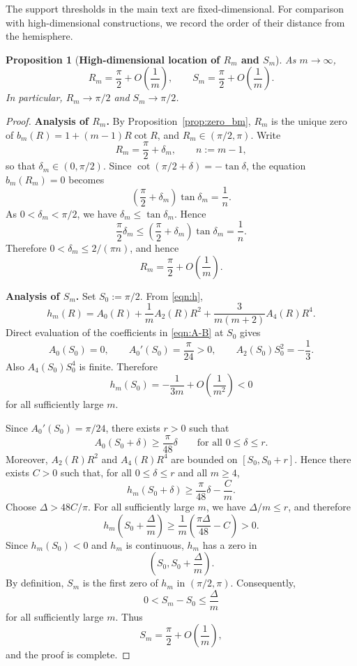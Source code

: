 \documentclass{amsart}
\newtheorem{proposition}[theorem]{Proposition}
\theoremstyle{definition}
\theoremstyle{remark}
\newcommand\0{\boldsymbol{0}}
\begin{document}
The support thresholds in the main text are fixed-dimensional. For comparison with high-dimensional constructions, we record the order of their distance from the hemisphere.

\begin{proposition}[\textbf{High-dimensional location of \(R_m\) and \(S_m\)}]
\label{prop:asymptotics-Rm-Sm}
\label{prop:asymp-first-zero-h_m}
As \(m\to\infty\),
\[
R_m=\frac{\pi}{2}+O\!\left(\frac{1}{m}\right),
\qquad
S_m=\frac{\pi}{2}+O\!\left(\frac{1}{m}\right).
\]
In particular, \(R_m\to\pi/2\) and \(S_m\to\pi/2\).
\end{proposition}

\begin{proof}
\textbf{Analysis of \(R_m\).} By Proposition~\ref{prop:zero_bm}, \(R_m\) is the unique zero of \(b_m(R)=1+(m-1)R\cot R\), and \(R_m\in(\pi/2,\pi)\). Write
\[
R_m=\frac{\pi}{2}+\delta_m,
\qquad
n:=m-1,
\]
so that \(\delta_m\in(0,\pi/2)\). Since \(\cot(\pi/2+\delta)=-\tan\delta\), the equation \(b_m(R_m)=0\) becomes
\[
\left(\frac{\pi}{2}+\delta_m\right)\tan\delta_m=\frac{1}{n}.
\]
As \(0<\delta_m<\pi/2\), we have \(\delta_m\le\tan\delta_m\). Hence
\[
\frac{\pi}{2}\delta_m
\le
\left(\frac{\pi}{2}+\delta_m\right)\tan\delta_m
=
\frac{1}{n}.
\]
Therefore \(0<\delta_m\le 2/(\pi n)\), and hence
\[
R_m=\frac{\pi}{2}+O\!\left(\frac{1}{m}\right).
\]

\textbf{Analysis of \(S_m\).}  Set \(S_0:=\pi/2\). From \eqref{eqn:h},
\[
h_m(R)=A_0(R)+\frac{1}{m}A_2(R)R^2+\frac{3}{m(m+2)}A_4(R)R^4.
\]
Direct evaluation of the coefficients in \eqref{eqn:A-B} at \(S_0\) gives
\[
A_0(S_0)=0,
\qquad
A_0'(S_0)=\frac{\pi}{24}>0,
\qquad
A_2(S_0)S_0^2=-\frac{1}{3}.
\]
Also \(A_4(S_0)S_0^4\) is finite. Therefore
\[
h_m(S_0)
=
-\frac{1}{3m}
+
O\!\left(\frac{1}{m^2}\right)
<0
\]
for all sufficiently large \(m\).

Since \(A_0'(S_0)=\pi/24\), there exists \(r>0\) such that
\[
A_0(S_0+\delta)\ge \frac{\pi}{48}\delta
\qquad
\text{for all }0\le\delta\le r.
\]
Moreover, \(A_2(R)R^2\) and \(A_4(R)R^4\) are bounded on \([S_0,S_0+r]\). Hence there exists \(C>0\) such that, for all \(0\le\delta\le r\) and all \(m\ge4\),
\[
h_m(S_0+\delta)
\ge
\frac{\pi}{48}\delta-\frac{C}{m}.
\]
Choose \(\Delta>48C/\pi\). For all sufficiently large \(m\), we have \(\Delta/m\le r\), and therefore
\[
h_m\!\left(S_0+\frac{\Delta}{m}\right)
\ge
\frac{1}{m}\left(\frac{\pi\Delta}{48}-C\right)>0.
\]
Since \(h_m(S_0)<0\) and \(h_m\) is continuous, \(h_m\) has a zero in
\[
\left(S_0,S_0+\frac{\Delta}{m}\right).
\]
By definition, \(S_m\) is the first zero of \(h_m\) in \((\pi/2,\pi)\). Consequently,
\[
0<S_m-S_0\le \frac{\Delta}{m}
\]
for all sufficiently large \(m\). Thus
\[
S_m=\frac{\pi}{2}+O\!\left(\frac{1}{m}\right),
\]
and the proof is complete.
\end{proof}
\end{document}
